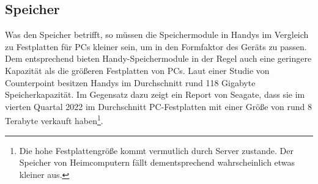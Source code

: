\subsection{Speicher}
Was den Speicher betrifft, so müssen die Speichermodule in Handys im Vergleich zu Festplatten für PCs kleiner sein, um in den Formfaktor des Geräts zu passen. Dem entsprechend bieten Handy-Speichermodule in der Regel auch eine geringere Kapazität als die größeren Festplatten von PCs. %
	Laut einer Studie von Counterpoint besitzen Handys im Durchschnitt rund 118 Gigabyte Speicherkapazität\cite{pcVsphone_storageSmartphone}. Im Gegensatz dazu zeigt ein Report von Seagate, dass sie im vierten Quartal 2022 im Durchschnitt PC-Festplatten mit einer Größe von rund 8 Terabyte verkauft haben\cite{pcVsphone_storageSeagate}\footnote{Die hohe Festplattengröße kommt vermutlich durch Server zustande. Der Speicher von Heimcomputern fällt dementsprechend wahrscheinlich etwas kleiner aus.}.%
%
%
%		
%	
%
